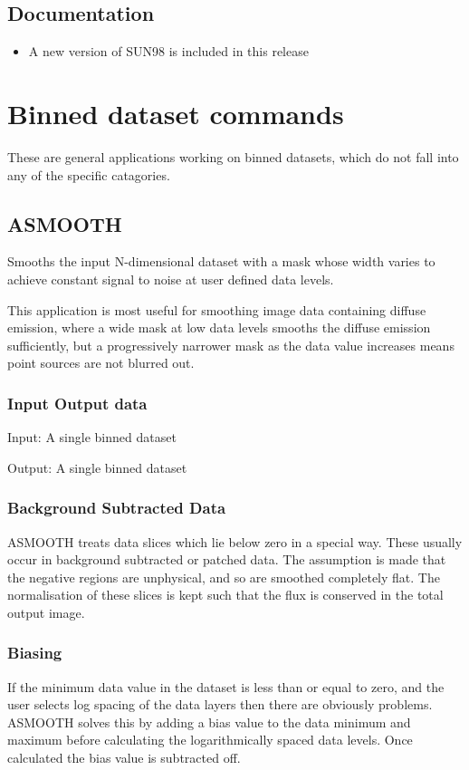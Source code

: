 \documentclass{book}
\renewcommand{\_}{{\tt\char'137}}     %
\begin{document}
\section{Documentation}
\begin{itemize}
\item A new version of SUN98 is included in this release
\end{itemize}
\chapter{Binned dataset commands}
These are general applications working on binned datasets, which
do not fall into any of the specific catagories.

\section{ASMOOTH}
Smooths the input N-dimensional dataset with a mask whose width
varies to achieve constant signal to noise at user defined data
levels.

This application is most useful for smoothing image data containing
diffuse emission, where a wide mask at low data levels smooths the
diffuse emission sufficiently, but a progressively narrower mask
as the data value increases means point sources are not blurred out.

\subsection{Input Output data}
Input: A single binned dataset

Output: A single binned dataset

\subsection{Background Subtracted Data}
ASMOOTH treats data slices which lie below zero in a special way.
These usually occur in background subtracted or patched data. The
assumption is made that the negative regions are unphysical, and
so are smoothed completely flat. The normalisation of these slices
is kept such that the flux is conserved in the total output image.

\subsection{Biasing}
If the minimum data value in the dataset is less than or equal to
zero, and the user selects log spacing of the data layers then
there are obviously problems. ASMOOTH solves this by adding a bias
value to the data minimum and maximum before calculating the
logarithmically spaced data levels. Once calculated the bias value
is subtracted off.
\end{document}
